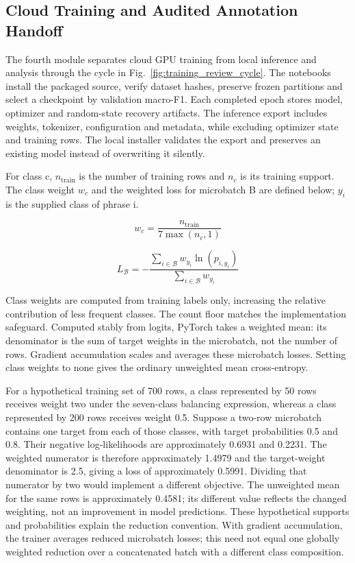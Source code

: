 \documentclass[journal]{IEEEtran}
\begin{document}
\subsection{Cloud Training and Audited Annotation Handoff}

The fourth module separates cloud GPU training from local inference and analysis through the cycle in Fig.~\ref{fig:training_review_cycle}. The notebooks install the packaged source, verify dataset hashes, preserve frozen partitions and select a checkpoint by validation macro-F1. Each completed epoch stores model, optimizer and random-state recovery artifacts. The inference export includes weights, tokenizer, configuration and metadata, while excluding optimizer state and training rows. The local installer validates the export and preserves an existing model instead of overwriting it silently.

For class c, \(n_{\mathrm{train}}\) is the number of training rows and \(n_c\) is its training support. The class weight \(w_c\) and the weighted loss for microbatch B are defined below; \(y_i\) is the supplied class of phrase i.

\begin{equation}
w_c=\frac{n_{\mathrm{train}}}{7\max(n_c,1)}
\label{eq:class_weights}
\end{equation}

\begin{equation}
L_{\mathcal B}=-\frac{\sum_{i\in\mathcal B}w_{y_i}\ln(p_{i,y_i})}{\sum_{i\in\mathcal B}w_{y_i}}
\label{eq:weighted_ce}
\end{equation}

Class weights are computed from training labels only, increasing the relative contribution of less frequent classes. The count floor matches the implementation safeguard. Computed stably from logits, PyTorch takes a weighted mean: its denominator is the sum of target weights in the microbatch, not the number of rows. Gradient accumulation scales and averages these microbatch losses. Setting class weights to none gives the ordinary unweighted mean cross-entropy.

For a hypothetical training set of 700 rows, a class represented by 50 rows receives weight two under the seven-class balancing expression, whereas a class represented by 200 rows receives weight 0.5. Suppose a two-row microbatch contains one target from each of those classes, with target probabilities 0.5 and 0.8. Their negative log-likelihoods are approximately 0.6931 and 0.2231. The weighted numerator is therefore approximately 1.4979 and the target-weight denominator is 2.5, giving a loss of approximately 0.5991. Dividing that numerator by two would implement a different objective. The unweighted mean for the same rows is approximately 0.4581; its different value reflects the changed weighting, not an improvement in model predictions. These hypothetical supports and probabilities explain the reduction convention. With gradient accumulation, the trainer averages reduced microbatch losses; this need not equal one globally weighted reduction over a concatenated batch with a different class composition.
\end{document}
